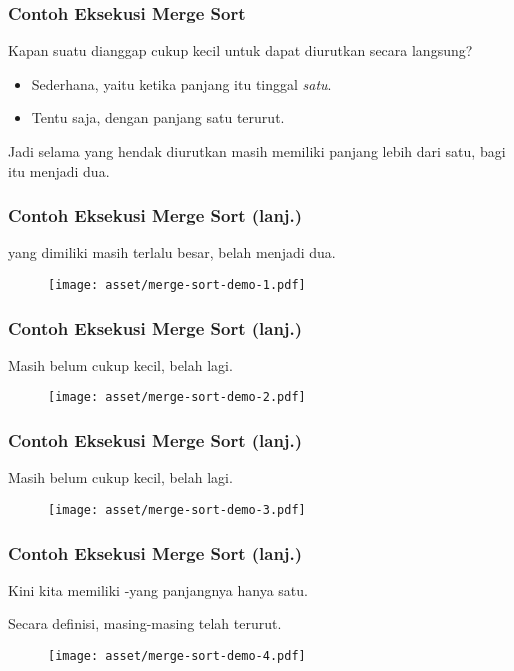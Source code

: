 \begin{frame}
\frametitle{Contoh Eksekusi Merge Sort}
Kapan suatu \farray dianggap cukup kecil untuk dapat diurutkan secara langsung?
\newline
\begin{itemize}
  \item Sederhana, yaitu ketika panjang \farray itu tinggal \emph{satu}.
  \item Tentu saja, \farray dengan panjang satu  terurut.
  \newline
\end{itemize}
Jadi selama \farray yang hendak diurutkan masih memiliki panjang lebih dari satu, bagi \farray itu menjadi dua.
\end{frame}

\begin{frame}
\frametitle{Contoh Eksekusi Merge Sort (lanj.)}
\fArray yang dimiliki masih terlalu besar, belah menjadi dua.
\begin{figure}
  \centering
  \texttt{[image: asset/merge-sort-demo-1.pdf]}
\end{figure}
\end{frame}

\begin{frame}
\frametitle{Contoh Eksekusi Merge Sort (lanj.)}
Masih belum cukup kecil, belah lagi.
\begin{figure}
  \centering
  \texttt{[image: asset/merge-sort-demo-2.pdf]}
\end{figure}
\end{frame}

\begin{frame}
\frametitle{Contoh Eksekusi Merge Sort (lanj.)}
Masih belum cukup kecil, belah lagi.
\begin{figure}
  \centering
  \texttt{[image: asset/merge-sort-demo-3.pdf]}
\end{figure}
\end{frame}

\begin{frame}
\frametitle{Contoh Eksekusi Merge Sort (lanj.)}
Kini kita memiliki \farray-\farray yang panjangnya hanya satu.\newline

Secara definisi, masing-masing \farray telah terurut.
\begin{figure}
  \centering
  \texttt{[image: asset/merge-sort-demo-4.pdf]}
\end{figure}
\end{frame}

